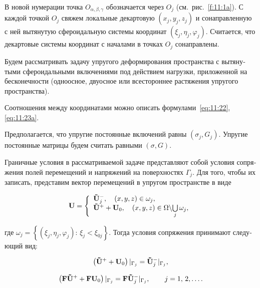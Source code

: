 \begin{russian}
В новой нумерации точка $O_{\alpha,\beta,\gamma}$ обозначается через $O_j$ (см.~рис.~\ref{f:11:1a}). С каждой точкой $O_j$ свяжем локальные декартовую $(x_j,y_j,z_j)$ и сонаправленную с ней вытянутую сфероидальную системы координат $(\xi_j,\eta_j,\varphi_j)$. Считается, что декартовые системы координат с началами в точках $O_j$ сонаправлены.

Будем рассматривать задачу упругого деформирования пространства с вытянутыми сфероидальными включениями под действием нагрузки, приложенной на бесконечности (одноосное, двуосное или всестороннее растяжения упругого пространства).

Соотношения между координатами можно описать формулами~\eqref{eq:11:22}, \eqref{eq:11:23a}.

Предполагается, что упругие постоянные включений равны $(\sigma_j,G_j)$. Упругие постоянные матрицы будем считать равными $(\sigma,G)$.

Граничные условия в рассматриваемой задаче представляют собой условия сопряжения полей перемещений и напряжений на поверхностях $\Gamma_j$. Для того, чтобы их записать, представим вектор перемещений в упругом пространстве в виде

\begin{equation}
{\bf{U}} = \left\{ {\begin{array}{*{20}{l}}
{{\bf{\tilde U}}_j^ - ,\quad \left( {x,y,z} \right) \in \omega_j,}\\
{{{{\bf{\tilde U}}}^ + } + {{\bf{U}}_0},\quad \left( {x,y,z} \right) \in\Omega\backslash {\bigcup\limits_j\omega_j},}
\end{array}} \right.
\label{eq:11:23i}
\end{equation}

\noindent где $\omega_j = \left\{ {\left( {{\xi_j},{\eta _j},{\varphi _j}} \right):\, {\xi_j} < {\xi_{0j}}} \right\}$. Тогда условия сопряжения принимают следующий вид:

\begin{equation}
\left( {{{{\bf{\tilde U}}}^ + } + {{\bf{U}}_0}} \right){|_{{\Gamma _j}}} = {\bf{\tilde U}}_j^ - {|_{{\Gamma _j}}},
\label{eq:11:24i}
\end{equation}

\begin{equation}
\left( {{\bf{F\tilde U^+}} + {\bf{F}}{{\bf{U}}_0}} \right){|_{{\Gamma _j}}} = {\bf{F}}{{\bf{\tilde U^-}}_j}{|_{{\Gamma _j}}},\qquad {\kern 1pt} j = 1,{\mkern 1mu} {\kern 1pt} 2,\dots.
\label{eq:11:25i}
\end{equation}


\end{russian}
